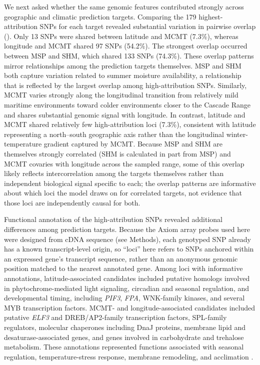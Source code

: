 \documentclass[]{article}
\providecommand{\revpoint}[2]{}%
\begin{document}
We next asked whether the same genomic features contributed strongly across geographic 
and climatic prediction targets. Comparing the 179 highest-attribution SNPs for 
each target revealed substantial variation in pairwise overlap (). 
Only 13 SNPs were shared between latitude and MCMT (7.3\%), 
whereas longitude and MCMT shared 97 SNPs (54.2\%). 
The strongest overlap occurred between MSP and SHM, which shared 133 SNPs (74.3\%). 
These overlap patterns mirror relationships among the prediction targets themselves. 
MSP and SHM both capture variation related to summer moisture availability, a 
relationship that is reflected by the largest overlap among high-attribution SNPs. 
Similarly, MCMT varies strongly along the longitudinal transition from relatively 
mild maritime environments toward colder environments closer to the Cascade Range 
and shares substantial genomic signal with longitude. In contrast, 
latitude and MCMT shared relatively few high-attribution loci (7.3\%), 
consistent with latitude representing a north--south geographic axis rather
than the longitudinal winter-temperature gradient captured by MCMT. Because
MSP and SHM are themselves strongly correlated (SHM is calculated in part
from MSP) and MCMT covaries with longitude across the sampled range, some of
this overlap likely reflects intercorrelation among the targets themselves
rather than independent biological signal specific to each; the overlap
patterns are informative about which loci the model draws on for correlated
targets, not evidence that those loci are independently causal for both.

Functional annotation of the high-attribution SNPs revealed additional
differences among prediction targets. Because the Axiom array probes used here were designed\revpoint{2}{14}
from cDNA sequence (see Methods), each genotyped SNP already has a known
transcript-level origin, so ``loci'' here refers to SNPs anchored within an
expressed gene's transcript sequence, rather than an anonymous genomic
position matched to the nearest annotated gene. Among loci with informative annotations,
latitude-associated candidates included putative homologs involved in 
phytochrome-mediated light signaling, circadian and seasonal regulation, 
and developmental timing, including \textit{PIF3}, \textit{FPA}, WNK-family kinases, 
and several MYB transcription factors. MCMT- and longitude-associated candidates 
included putative \textit{ELF3} and DREB/AP2-family transcription factors, 
SPL-family regulators, molecular chaperones including DnaJ proteins, 
membrane lipid and desaturase-associated genes, and genes involved in 
carbohydrate and trehalose metabolism. These annotations represented 
functions associated with seasonal regulation, temperature-stress response, 
membrane remodeling, and acclimation \citep{lee_photoperiodic_2012, chen_acyl_2013}. 
\end{document}
